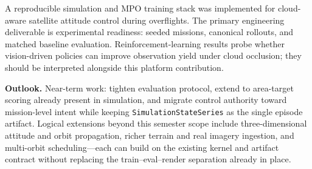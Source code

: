 \label{sec:conclusion}

A reproducible simulation and MPO training stack was implemented for cloud-aware satellite attitude control during overflights.
The primary engineering deliverable is experimental readiness: seeded missions, canonical rollouts, and matched baseline evaluation.
Reinforcement-learning results probe whether vision-driven policies can improve observation yield under cloud occlusion; they should be interpreted alongside this platform contribution.

\textbf{Outlook.}
Near-term work: tighten evaluation protocol, extend to area-target scoring already present in simulation, and migrate control authority toward mission-level intent while keeping \texttt{SimulationStateSeries} as the single episode artifact.
Logical extensions beyond this semester scope include three-dimensional attitude and orbit propagation, richer terrain and real imagery ingestion, and multi-orbit scheduling---each can build on the existing kernel and artifact contract without replacing the train--eval--render separation already in place.

